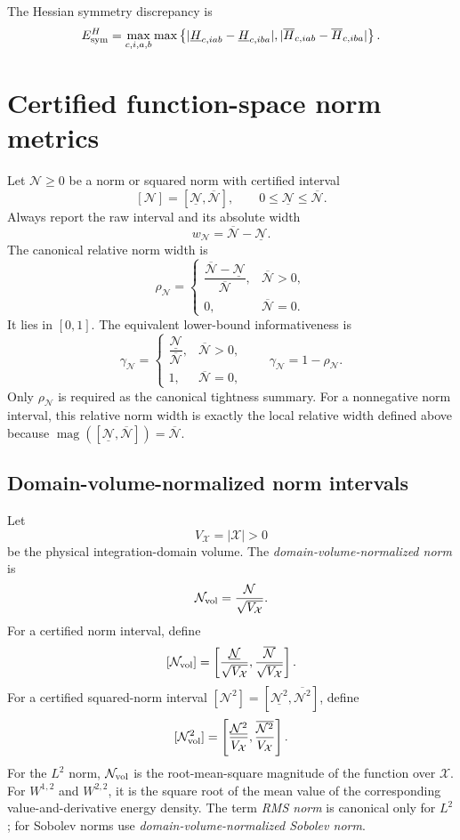 \documentclass[11pt]{article}
\newcommand{\magI}{\operatorname{mag}}
\begin{document}
The Hessian symmetry discrepancy is
\[
 E_{\rm sym}^H
 =\max_{c,i,a,b}\max\left\{
 |\underline H_{c,iab}-\underline H_{c,iba}|,
 |\overline H_{c,iab}-\overline H_{c,iba}|
 \right\}.
\]

\section{Certified function-space norm metrics}

Let \(\mathcal N\geq0\) be a norm or squared norm with certified interval
\[
 [\mathcal N]=[\underline{\mathcal N},\overline{\mathcal N}],
 \qquad 0\leq\underline{\mathcal N}\leq\overline{\mathcal N}.
\]
Always report the raw interval and its absolute width
\[
 w_{\mathcal N}=\overline{\mathcal N}-\underline{\mathcal N}.
\]
The canonical relative norm width is
\[
 \rho_{\mathcal N}=
 \begin{cases}
  \dfrac{\overline{\mathcal N}-\underline{\mathcal N}}
        {\overline{\mathcal N}},&\overline{\mathcal N}>0,\\[2mm]
  0,&\overline{\mathcal N}=0.
 \end{cases}
\]
It lies in \([0,1]\).  The equivalent lower-bound informativeness is
\[
 \gamma_{\mathcal N}=
 \begin{cases}
  \dfrac{\underline{\mathcal N}}{\overline{\mathcal N}},
  &\overline{\mathcal N}>0,\\[2mm]
  1,&\overline{\mathcal N}=0,
 \end{cases}
 \qquad \gamma_{\mathcal N}=1-\rho_{\mathcal N}.
\]
Only \(\rho_{\mathcal N}\) is required as the canonical tightness
summary.  For a nonnegative norm interval, this relative norm width is exactly
the local relative width defined above because
\(\magI([\underline{\mathcal N},\overline{\mathcal N}])
=\overline{\mathcal N}\).

\subsection{Domain-volume-normalized norm intervals}

Let
\[
 V_{\mathcal X}=|\mathcal X|>0
\]
be the physical integration-domain volume.  The
\emph{domain-volume-normalized norm} is
\[
 \mathcal N_{\rm vol}=\frac{\mathcal N}{\sqrt{V_{\mathcal X}}}.
\]
For a certified norm interval, define
\[
 [\mathcal N_{\rm vol}]
 =\left[
 \frac{\underline{\mathcal N}}{\sqrt{V_{\mathcal X}}},
 \frac{\overline{\mathcal N}}{\sqrt{V_{\mathcal X}}}
 \right].
\]
For a certified squared-norm interval
\([\mathcal N^2]=[\underline{\mathcal N^2},
\overline{\mathcal N^2}]\), define
\[
 [\mathcal N_{\rm vol}^2]
 =\left[
 \frac{\underline{\mathcal N^2}}{V_{\mathcal X}},
 \frac{\overline{\mathcal N^2}}{V_{\mathcal X}}
 \right].
\]
For the \(L^2\) norm, \(\mathcal N_{\rm vol}\) is the root-mean-square
magnitude of the function over \(\mathcal X\).  For \(W^{1,2}\) and
\(W^{2,2}\), it is the square root of the mean value of the corresponding
value-and-derivative energy density.  The term \emph{RMS norm} is canonical
only for \(L^2\); for Sobolev norms use \emph{domain-volume-normalized
Sobolev norm}.
\end{document}
